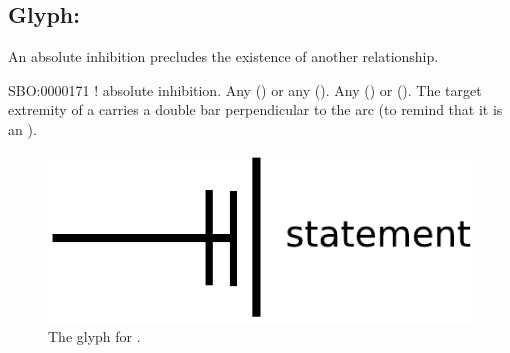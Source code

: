 \color{green}

\subsection{Glyph: }\label{sec:absoluteInhibition}

An absolute inhibition precludes the existence of another relationship. 

\begin{glyphDescription}
 \glyphSboTerm SBO:0000171 ! absolute inhibition.
 \glyphOrigin Any  () or any  ().
 \glyphTarget Any  () or  ().
 \glyphEndPoint The target extremity of a  carries a double bar perpendicular to the arc (to remind that it is an ).
 \end{glyphDescription}

\begin{figure}[H]
  \centering
  \includegraphics[scale = 0.5]{images/absoluteInhibition}
  \caption{The \PD glyph for .}
  \label{fig:absoluteInhibition}
\end{figure}
% 
% 
% 
% 
% 
% 
% 

